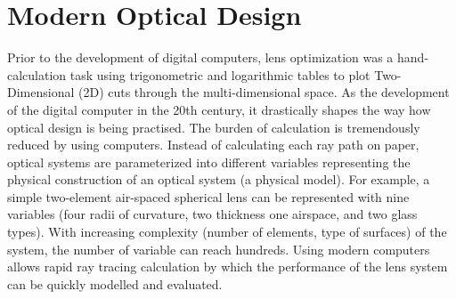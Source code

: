 \section{Modern Optical Design}
\vspace{1em}
Prior to the development of digital computers, lens optimization was a hand-calculation task using trigonometric and logarithmic tables to plot Two-Dimensional (2D) cuts through the multi-dimensional space. As the development of the digital computer in the 20th century, it drastically shapes the way how optical design is being practised. The burden of calculation is tremendously reduced by using computers. Instead of calculating each ray path on paper,  optical systems are parameterized into different variables representing the physical construction of an optical system (a physical model). For example, a simple two-element air-spaced spherical lens can be represented with nine variables (four radii of curvature, two thickness one airspace, and two glass types). With increasing complexity (number of elements, type of surfaces) of the system, the number of variable can reach hundreds. Using modern computers allows rapid ray tracing calculation by which the performance of the lens system can be quickly modelled and evaluated. 

